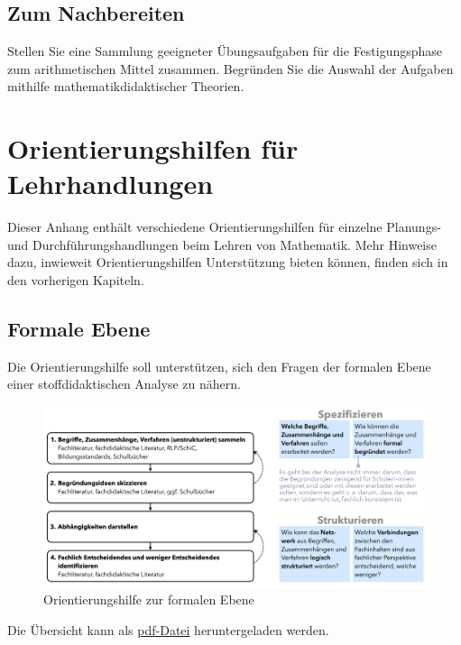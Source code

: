 \documentclass[
]{scrbook}
\theoremstyle{definition}
\theoremstyle{definition}
\theoremstyle{definition}
\theoremstyle{definition}
\theoremstyle{remark}
\begin{document}
\section{Zum Nachbereiten}\label{beispiel-arithmetisches-mitttel-nachbereitung}

Stellen Sie eine Sammlung geeigneter Übungsaufgaben für die Festigungsphase zum arithmetischen Mittel zusammen. Begründen Sie die Auswahl der Aufgaben mithilfe mathematikdidaktischer Theorien.

\chapter{Orientierungshilfen für Lehrhandlungen}\label{orientierungshilfen-fuxfcr-lehrhandlungen}

Dieser Anhang enthält verschiedene Orientierungshilfen für einzelne Planungs- und Durchführungshandlungen beim Lehren von Mathematik. Mehr Hinweise dazu, inwieweit Orientierungshilfen Unterstützung bieten können, finden sich in den vorherigen Kapiteln.

\section{Formale Ebene}\label{orientierungshilfe-formale-ebene}

Die Orientierungshilfe soll unterstützen, sich den Fragen der formalen Ebene einer stoffdidaktischen Analyse zu nähern.

\begin{figure}

{\centering \includegraphics[width=0.9\linewidth]{pictures/C-OrientierungshilfeFormaleEbene} 

}

\caption{Orientierungshilfe zur formalen Ebene}\label{fig:OrientierungFormal}
\end{figure}

Die Übersicht kann als \href{files/Stoffdidaktik2024-OrientierungshilfeFormaleEbene.pdf}{pdf-Datei} heruntergeladen werden.
\end{document}
